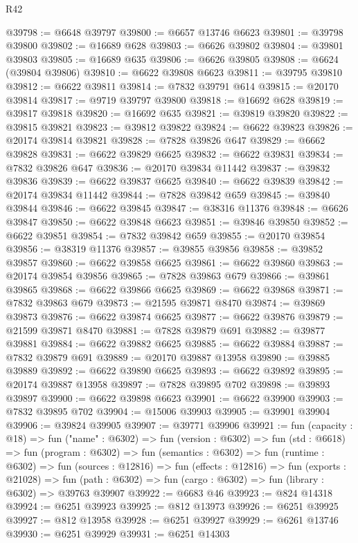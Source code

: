 \begin{lexlean}{R42}
\begin{coremodule}
{@39798 := @6648 @39797
@39800 := @6657 @13746 @6623
@39801 := @39798 @39800
@39802 := @16689 @628
@39803 := @6626 @39802
@39804 := @39801 @39803
@39805 := @16689 @635
@39806 := @6626 @39805
@39808 := @6624 (@39804 @39806)
@39810 := @6622 @39808 @6623
@39811 := @39795 @39810
@39812 := @6622 @39811
@39814 := @7832 @39791 @614
@39815 := @20170 @39814
@39817 := @9719 @39797 @39800
@39818 := @16692 @628
@39819 := @39817 @39818
@39820 := @16692 @635
@39821 := @39819 @39820
@39822 := @39815 @39821
@39823 := @39812 @39822
@39824 := @6622 @39823
@39826 := @20174 @39814 @39821
@39828 := @7828 @39826 @647
@39829 := @6662 @39828
@39831 := @6622 @39829 @6625
@39832 := @6622 @39831
@39834 := @7832 @39826 @647
@39836 := @20170 @39834 @11442
@39837 := @39832 @39836
@39839 := @6622 @39837 @6625
@39840 := @6622 @39839
@39842 := @20174 @39834 @11442
@39844 := @7828 @39842 @659
@39845 := @39840 @39844
@39846 := @6622 @39845
@39847 := @38316 @11376
@39848 := @6626 @39847
@39850 := @6622 @39848 @6623
@39851 := @39846 @39850
@39852 := @6622 @39851
@39854 := @7832 @39842 @659
@39855 := @20170 @39854
@39856 := @38319 @11376
@39857 := @39855 @39856
@39858 := @39852 @39857
@39860 := @6622 @39858 @6625
@39861 := @6622 @39860
@39863 := @20174 @39854 @39856
@39865 := @7828 @39863 @679
@39866 := @39861 @39865
@39868 := @6622 @39866 @6625
@39869 := @6622 @39868
@39871 := @7832 @39863 @679
@39873 := @21595 @39871 @8470
@39874 := @39869 @39873
@39876 := @6622 @39874 @6625
@39877 := @6622 @39876
@39879 := @21599 @39871 @8470
@39881 := @7828 @39879 @691
@39882 := @39877 @39881
@39884 := @6622 @39882 @6625
@39885 := @6622 @39884
@39887 := @7832 @39879 @691
@39889 := @20170 @39887 @13958
@39890 := @39885 @39889
@39892 := @6622 @39890 @6625
@39893 := @6622 @39892
@39895 := @20174 @39887 @13958
@39897 := @7828 @39895 @702
@39898 := @39893 @39897
@39900 := @6622 @39898 @6623
@39901 := @6622 @39900
@39903 := @7832 @39895 @702
@39904 := @15006 @39903
@39905 := @39901 @39904
@39906 := @39824 @39905
@39907 := @39771 @39906
@39921 := fun (capacity : @18) =>
  fun ("name" : @6302) =>
  fun (version : @6302) =>
  fun (std : @6618) =>
  fun (program : @6302) =>
  fun (semantics : @6302) =>
  fun (runtime : @6302) =>
  fun (sources : @12816) =>
  fun (effects : @12816) =>
  fun (exports : @21028) =>
  fun (path : @6302) => fun (cargo : @6302) => fun (library : @6302) => @39763 @39907
@39922 := @6683 @46
@39923 := @824 @14318
@39924 := @6251 @39923
@39925 := @812 @13973
@39926 := @6251 @39925
@39927 := @812 @13958
@39928 := @6251 @39927
@39929 := @6261 @13746
@39930 := @6251 @39929
@39931 := @6251 @14303
}
\end{coremodule}
\end{lexlean}
